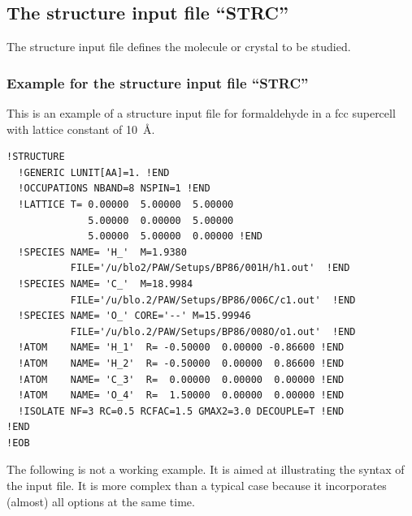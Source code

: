\documentclass[final,12pt,makeidx,DIV=calc]{article}
\begin{document}
\subsection{The structure input file ``STRC''}
The structure input file defines the molecule or crystal to be
studied. 
\subsubsection{Example for the structure input file ``STRC''}
This is an example of a structure input file for formaldehyde in a fcc
supercell with lattice constant of 10~\AA.
\begin{verbatim}
!STRUCTURE
  !GENERIC LUNIT[AA]=1. !END   
  !OCCUPATIONS NBAND=8 NSPIN=1 !END
  !LATTICE T= 0.00000  5.00000  5.00000               
              5.00000  0.00000  5.00000               
              5.00000  5.00000  0.00000 !END
  !SPECIES NAME= 'H_'  M=1.9380 
           FILE='/u/blo2/PAW/Setups/BP86/001H/h1.out'  !END 
  !SPECIES NAME= 'C_'  M=18.9984 
           FILE='/u/blo.2/PAW/Setups/BP86/006C/c1.out'  !END 
  !SPECIES NAME= 'O_' CORE='--' M=15.99946 
           FILE='/u/blo.2/PAW/Setups/BP86/008O/o1.out'  !END 
  !ATOM    NAME= 'H_1'  R= -0.50000  0.00000 -0.86600 !END
  !ATOM    NAME= 'H_2'  R= -0.50000  0.00000  0.86600 !END
  !ATOM    NAME= 'C_3'  R=  0.00000  0.00000  0.00000 !END
  !ATOM    NAME= 'O_4'  R=  1.50000  0.00000  0.00000 !END
  !ISOLATE NF=3 RC=0.5 RCFAC=1.5 GMAX2=3.0 DECOUPLE=T !END 
!END 
!EOB 
\end{verbatim}
The following is not a working example. It is aimed at illustrating
the syntax of the input file. It is more complex than a typical case
because it incorporates (almost) all options at the same time.
\end{document}
